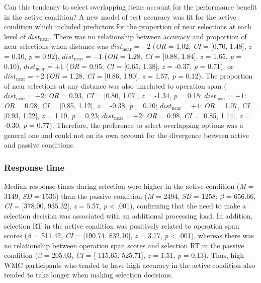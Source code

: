 \documentclass[floatsintext,man]{apa6}
\theoremstyle{definition}
\theoremstyle{definition}
\theoremstyle{definition}
\theoremstyle{remark}
\begin{document}
Can this tendency to select overlapping items account for the
performance benefit in the active condition? A new model of test
accuracy was fit for the active condition which included predictors for
the proportion of near selections at each level of
\(dist_{\text{near}}\). There was no relationship between accuracy and
proportion of near selections when distance was
\(dist_{\text{near}}=-2\) (\emph{OR} = 1.02, \emph{CI} = {[}0.70,
1.48{]}, \emph{z} = 0.10, \emph{p} = 0.92), \(dist_{\text{near}}=-1\)
(\emph{OR} = 1.28, \emph{CI} = {[}0.88, 1.84{]}, \emph{z} = 1.65,
\emph{p} = 0.10), \(dist_{\text{near}}=+1\) (\emph{OR} = 0.95, \emph{CI}
= {[}0.65, 1.38{]}, \emph{z} = -0.37, \emph{p} = 0.71), or
\(dist_{\text{near}}=+2\) (\emph{OR} = 1.28, \emph{CI} = {[}0.86,
1.90{]}, \emph{z} = 1.57, \emph{p} = 0.12). The proportion of near
selections at any distance was also unrelated to operation span
(\(dist_{\text{near}}=-2\): \emph{OR} = 0.93, \emph{CI} = {[}0.80,
1.07{]}, \emph{z} = -1.34, \emph{p} = 0.18; \(dist_{\text{near}}=-1\):
\emph{OR} = 0.98, \emph{CI} = {[}0.85, 1.12{]}, \emph{z} = -0.38,
\emph{p} = 0.70; \(dist_{\text{near}}=+1\): \emph{OR} = 1.07, \emph{CI}
= {[}0.93, 1.22{]}, \emph{z} = 1.19, \emph{p} = 0.23;
\(dist_{\text{near}}=+2\): \emph{OR} = 0.98, \emph{CI} = {[}0.85,
1.14{]}, \emph{z} = -0.30, \emph{p} = 0.77). Therefore, the preference
to select overlapping options was a general one and could not on its own
account for the divergence between active and passive conditions.

\subsubsection{Response time}\label{response-time-1}

Median response times during selection were higher in the active
condition (\emph{M} = 3149, \emph{SD} = 1536) than the passive condition
(\emph{M} = 2494, \emph{SD} = 1258; \(\beta\) = 656.66, \emph{CI} =
{[}378.00, 935.32{]}, \emph{z} = 5.57, \emph{p} \textless{} .001),
confirming that the need to make a selection decision was associated
with an additional processing load. In addition, selection RT in the
active condition was positively related to operation span scores
(\(\beta\) = 511.42, \emph{CI} = {[}190.74, 832.10{]}, \emph{z} = 3.77,
\emph{p} \textless{} .001), whereas there was no relationship between
operation span scores and selection RT in the passive condition
(\(\beta\) = 205.03, \emph{CI} = {[}-115.65, 525.71{]}, \emph{z} = 1.51,
\emph{p} = 0.13). Thus, high WMC participants who tended to have high
accuracy in the active condition also tended to take longer when making
selection decisions.
\end{document}
